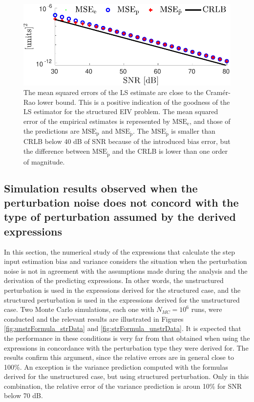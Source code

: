 \begin{figure}[!htpb]
  \centering
  \includegraphics[width=0.69\columnwidth]{./ChapterStatisticalAnalysis/fig/Fig_11.pdf}
  \caption{\label{fig:MSE_CRLB_str_stat}
The mean squared errors of the LS estimate are close to the Cram\'er-Rao lower bound. This is a positive indication of the goodness of the LS estimator for the structured EIV problem. The mean squared error of the empirical estimates is represented by $\mathrm{MSE}_{\mathrm{e}}$, and those of the predictions are $\mathrm{MSE}_{\mathrm{p}}$ and $\mathrm{MSE}_{\widetilde{\mathrm{p}}}$. The $\mathrm{MSE}_{\widetilde{\mathrm{p}}}$ is smaller than CRLB below 40 dB of SNR because of the introduced bias error, but the difference between $\mathrm{MSE}_{\widetilde{\mathrm{p}}}$ and the CRLB is lower than one order of magnitude.}
\end{figure}

\color{blue}

\subsection{Simulation results observed when the perturbation noise does not concord with the type of perturbation assumed by the derived expressions}

In this section, the numerical study of the expressions that calculate the step input estimation bias and variance considers the situation when the perturbation noise is not in agreement with the assumptions made during the analysis and the derivation of the predicting expressions.  
In other words, the unstructured perturbation is used in the expressions derived for the structured case, and the structured perturbation is used in the expressions derived for the unstructured case. 
Two Monte Carlo simulations, each one with $N_{MC} = 10^6$ runs, were conducted and the relevant results are illustrated in Figures \ref{fig:unstrFormula_strData} and \ref{fig:strFormula_unstrData}. 
It is expected that the performance in these conditions is very far from that obtained when using the expressions in concordance with the perturbation type they were derived for.
The results confirm this argument, since the relative errors are in general close to 100\%.
An exception is the variance prediction computed with the formulas derived for the unstructured case, but using structured perturbation. 
Only in this combination, the relative error of the variance prediction is aroun 10\% for SNR below 70 dB.


